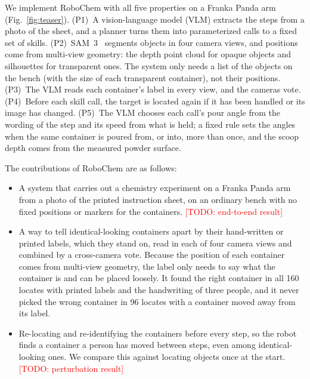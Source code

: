 \documentclass[letterpaper, 10pt, journal, twoside]{IEEEtran}}
\newcommand{\todo}[1]{\textcolor{red}{[TODO: #1]}}
\newcommand{\sysname}{RoboChem}   %
\begin{document}
We implement \sysname{} with all five properties on a Franka Panda arm
(Fig.~\ref{fig:teaser}). (P1)~A vision-language model (VLM) extracts the
steps from a photo of the sheet, and a planner turns them into parameterized
calls to a fixed set of skills. (P2)~SAM~3~\cite{carion2026sam3} segments
objects in four camera views, and positions come from multi-view geometry:
the depth point cloud for opaque objects and silhouettes for transparent
ones. The system only needs a list of the objects on the bench (with the
size of each transparent container), not their positions. (P3)~The VLM
reads each container's label in every view, and the cameras vote.
(P4)~Before each skill call, the target is located again if it has been
handled or its image has changed. (P5)~The VLM chooses each call's pour
angle from the wording of the step and its speed from what is held; a fixed
rule sets the angles when the same container is poured from, or into, more
than once, and the scoop depth comes from the measured powder surface.

The contributions of \sysname{} are as follows:
\begin{itemize}
  \item A system that carries out a chemistry experiment on a Franka Panda
  arm from a photo of the printed instruction sheet, on an ordinary bench
  with no fixed positions or markers for the containers.
  \todo{end-to-end result}
  \item A way to tell identical-looking containers apart by their
  hand-written or printed labels, which they stand on, read in each of four
  camera views and combined by a cross-camera vote. Because the position of
  each container comes from multi-view geometry, the label only needs to say
  what the container is and can be placed loosely. It found the right
  container in all 160 locates with printed labels and the handwriting of
  three people, and it never picked the wrong container in 96 locates with
  a container moved away from its label.
  \item Re-locating and re-identifying the containers before every step,
  so the robot finds a container a person has moved between steps, even
  among identical-looking ones. We compare this against locating objects
  once at the start. \todo{perturbation result}
\end{itemize}
\end{document}
